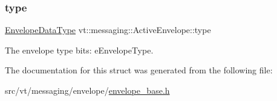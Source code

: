 \subsubsection{\texorpdfstring{type}{type}}
{\footnotesize\ttfamily \hyperlink{namespacevt_a2740126d59f361d9ba46f66b3b4b0d3d}{Envelope\+Data\+Type} vt\+::messaging\+::\+Active\+Envelope\+::type}



The envelope type bits\+: {\ttfamily e\+Envelope\+Type}. 



The documentation for this struct was generated from the following file\+:\begin{DoxyCompactItemize}
\item 
src/vt/messaging/envelope/\hyperlink{envelope__base_8h}{envelope\+\_\+base.\+h}\end{DoxyCompactItemize}
